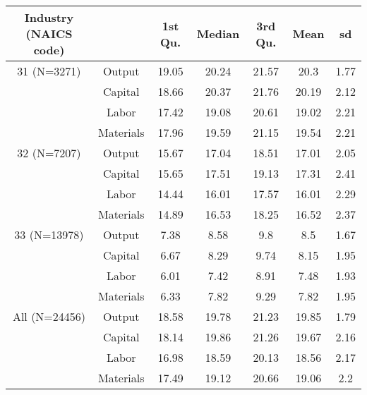 \begin{table}[H]
\centering
\begin{tabular}{ccccccc}
  \hline\hline Industry (NAICS code) &   & 1st Qu. & Median & 3rd Qu. & Mean & sd \\ 
  \hline
31 (N=3271) & Output & 19.05 & 20.24 & 21.57 & 20.3 & 1.77 \\ 
   & Capital & 18.66 & 20.37 & 21.76 & 20.19 & 2.12 \\ 
   & Labor & 17.42 & 19.08 & 20.61 & 19.02 & 2.21 \\ 
   & Materials & 17.96 & 19.59 & 21.15 & 19.54 & 2.21 \\ 
  32 (N=7207) & Output & 15.67 & 17.04 & 18.51 & 17.01 & 2.05 \\ 
   & Capital & 15.65 & 17.51 & 19.13 & 17.31 & 2.41 \\ 
   & Labor & 14.44 & 16.01 & 17.57 & 16.01 & 2.29 \\ 
   & Materials & 14.89 & 16.53 & 18.25 & 16.52 & 2.37 \\ 
  33 (N=13978) & Output & 7.38 & 8.58 & 9.8 & 8.5 & 1.67 \\ 
   & Capital & 6.67 & 8.29 & 9.74 & 8.15 & 1.95 \\ 
   & Labor & 6.01 & 7.42 & 8.91 & 7.48 & 1.93 \\ 
   & Materials & 6.33 & 7.82 & 9.29 & 7.82 & 1.95 \\ 
  All (N=24456) & Output & 18.58 & 19.78 & 21.23 & 19.85 & 1.79 \\ 
   & Capital & 18.14 & 19.86 & 21.26 & 19.67 & 2.16 \\ 
   & Labor & 16.98 & 18.59 & 20.13 & 18.56 & 2.17 \\ 
   & Materials & 17.49 & 19.12 & 20.66 & 19.06 & 2.2 \\ 
   \hline
\end{tabular}
\end{table}
